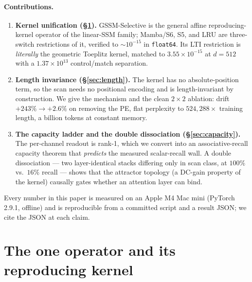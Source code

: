 \documentclass[11pt]{article}
\theoremstyle{definition}
\newcommand{\code}[1]{\texttt{#1}}
\begin{document}
\paragraph{Contributions.}
\begin{enumerate}
\item \textbf{Kernel unification (\S\ref{sec:kernel}).} GSSM-Selective is the general
affine reproducing-kernel operator of the linear-SSM family; Mamba/S6, S5, and LRU are
three-switch restrictions of it, verified to $\sim\!10^{-15}$ in \code{float64}. Its LTI
restriction is \emph{literally} the geometric Toeplitz kernel, matched to $3.55\times10^{-15}$
at $d{=}512$ with a $1.37\times10^{13}$ control/match separation.
\item \textbf{Length invariance (\S\ref{sec:length}).} The kernel has no absolute-position
term, so the scan needs no positional encoding and is length-invariant by construction. We
give the mechanism and the clean $2\times2$ ablation: drift $+243\%\to+2.6\%$ on removing
the PE, flat perplexity to $524{,}288\times$ training length, a billion tokens at constant
memory.
\item \textbf{The capacity ladder and the double dissociation (\S\ref{sec:capacity}).} The
per-channel readout is rank-1, which we convert into an associative-recall capacity theorem
that \emph{predicts} the measured scalar-recall wall. A double dissociation --- two
layer-identical stacks differing only in scan class, at $100\%$ vs.\ $16\%$ recall --- shows
that the attractor topology (a DC-gain property of the kernel) causally gates whether an
attention layer can bind.
\end{enumerate}
Every number in this paper is measured on an Apple M4 Mac mini (PyTorch 2.9.1, offline) and
is reproducible from a committed script and a result JSON; we cite the JSON at each claim.

\section{The one operator and its reproducing kernel}
\label{sec:kernel}
\end{document}
